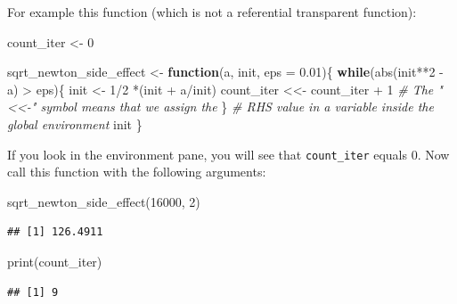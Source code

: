 \documentclass[
]{article}
\newenvironment{Shaded}{\begin{snugshade}}{\end{snugshade}}
\newcommand{\AttributeTok}[1]{\textcolor[rgb]{0.77,0.63,0.00}{#1}}
\newcommand{\CommentTok}[1]{\textcolor[rgb]{0.56,0.35,0.01}{\textit{#1}}}
\newcommand{\ControlFlowTok}[1]{\textcolor[rgb]{0.13,0.29,0.53}{\textbf{#1}}}
\newcommand{\DecValTok}[1]{\textcolor[rgb]{0.00,0.00,0.81}{#1}}
\newcommand{\FloatTok}[1]{\textcolor[rgb]{0.00,0.00,0.81}{#1}}
\newcommand{\FunctionTok}[1]{\textcolor[rgb]{0.00,0.00,0.00}{#1}}
\newcommand{\NormalTok}[1]{#1}
\newcommand{\OtherTok}[1]{\textcolor[rgb]{0.56,0.35,0.01}{#1}}
\newcommand{\SpecialCharTok}[1]{\textcolor[rgb]{0.00,0.00,0.00}{#1}}
\begin{document}
For example this function (which is not a referential transparent function):

\begin{Shaded}
\begin{Highlighting}[]
\NormalTok{count\_iter }\OtherTok{\textless{}{-}} \DecValTok{0}

\NormalTok{sqrt\_newton\_side\_effect }\OtherTok{\textless{}{-}} \ControlFlowTok{function}\NormalTok{(a, init, }\AttributeTok{eps =} \FloatTok{0.01}\NormalTok{)\{}
    \ControlFlowTok{while}\NormalTok{(}\FunctionTok{abs}\NormalTok{(init}\SpecialCharTok{**}\DecValTok{2} \SpecialCharTok{{-}}\NormalTok{ a) }\SpecialCharTok{\textgreater{}}\NormalTok{ eps)\{}
\NormalTok{        init }\OtherTok{\textless{}{-}} \DecValTok{1}\SpecialCharTok{/}\DecValTok{2} \SpecialCharTok{*}\NormalTok{(init }\SpecialCharTok{+}\NormalTok{ a}\SpecialCharTok{/}\NormalTok{init)}
\NormalTok{        count\_iter }\OtherTok{\textless{}\textless{}{-}}\NormalTok{ count\_iter }\SpecialCharTok{+} \DecValTok{1} \CommentTok{\# The "\textless{}\textless{}{-}" symbol means that we assign the}
\NormalTok{    \}                                 }\CommentTok{\# RHS value in a variable inside the global environment}
\NormalTok{    init}
\NormalTok{\}}
\end{Highlighting}
\end{Shaded}

If you look in the environment pane, you will see that \texttt{count\_iter} equals 0. Now call this
function with the following arguments:

\begin{Shaded}
\begin{Highlighting}[]
\FunctionTok{sqrt\_newton\_side\_effect}\NormalTok{(}\DecValTok{16000}\NormalTok{, }\DecValTok{2}\NormalTok{)}
\end{Highlighting}
\end{Shaded}

\begin{verbatim}
## [1] 126.4911
\end{verbatim}

\begin{Shaded}
\begin{Highlighting}[]
\FunctionTok{print}\NormalTok{(count\_iter)}
\end{Highlighting}
\end{Shaded}

\begin{verbatim}
## [1] 9
\end{verbatim}
\end{document}
